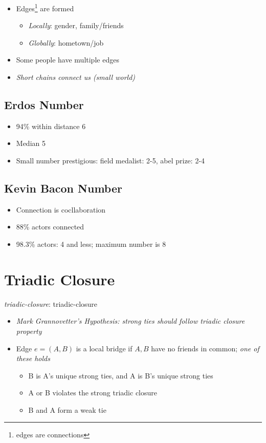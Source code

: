     \begin{itemize}
      \item Edges\footnote{edges are connections} are formed
      \begin{itemize}
        \item \emph{Locally}: gender, family/friends
        \item \emph{Globally}: hometown/job
      \end{itemize}

      \item Some people have multiple edges
      \item \emph{Short chains connect us (small world)}
    \end{itemize}

  \subsection{Erdos Number}

    \begin{itemize}
      \item 94\% within distance 6
      \item Median 5
      \item Small number prestigious: field medalist: 2-5, abel prize: 2-4
    \end{itemize}

  \subsection{Kevin Bacon Number}

    \begin{itemize}
      \item Connection is cocllaboration
      \item 88\% actors connected
      \item 98.3\% actors: 4 and less; maximum number is 8
    \end{itemize}

\section{Triadic Closure}

  \begin{definition}
    \emph{\Gls{triadic-closure}}: \glsdesc{triadic-closure}
  \end{definition}

  \begin{itemize}
    \item \emph{Mark Grannovetter's Hypothesis: strong ties should follow triadic
    closure property}
    \item Edge $ e = \left( A, B \right) $ is a local bridge if $ A, B $ have
    no friends in common; \emph{one of these holds}
    \begin{itemize}
      \item B is A's unique strong ties, and A is B's unique strong ties
      \item A or B violates the strong triadic closure
      \item B and A form a weak tie
    \end{itemize}
  \end{itemize}

